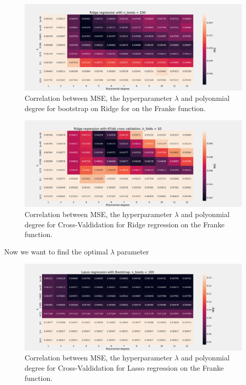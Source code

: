 \begin{figure}[H]
    \centering
    \caption{Correlation between MSE, the hyperparameter $\lambda$ and polyonmial degree for bootstrap on Ridge for on the Franke function.}  
    \label{fig:e_ridge} 
    \includegraphics[width=1\textwidth]{Figures/e_ridge_n_boots_100.png}
\end{figure}

\begin{figure}[H]
    \centering
    \caption{Correlation between MSE, the hyperparameter $\lambda$ and polyonmial degree for Cross-Valdidation for Ridge regression on the Franke function.}
    \label{fig:e_ridge_kfold}
    \includegraphics[width=\textwidth]{Figures/e_ridge_kfold_n_10.png}
\end{figure}

Now we want to find the optimal $\lambda$ parameter 




\begin{figure}[H]
    \centering
    \includegraphics[width=\textwidth]{Figures/f_lasso_bootstrap_n_100.png}
    \caption{Correlation between MSE, the hyperparameter $\lambda$ and polyonmial degree for Cross-Valdidation for Lasso regression on the Franke function.}
    \label{fig:f_lasso_bootstrap}
\end{figure}

